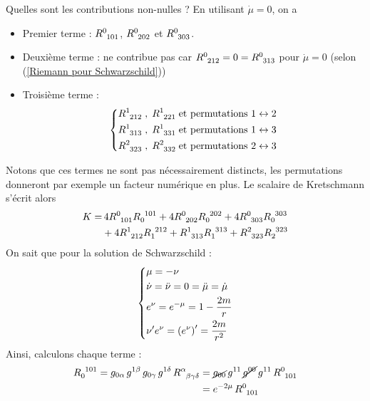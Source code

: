 Quelles sont les contributions non-nulles ? En utilisant $\dot{\mu} = 0$, on a
\begin{itemize}
    \item Premier terme : $R\indices{^0_{1 01}}$, $R\indices{^0_{2 02}}$ et $R\indices{^0_{3 03}}$.
    \item Deuxième terme : ne contribue pas car $R\indices{^0_{212}} =0 = R\indices{^0_{313}}$ pour $\dot{\mu} = 0$ (selon (\ref{Riemann pour Schwarzschild}))
    \item Troisième terme :
    \begin{align}
        \begin{dcases}
            R\indices{^1_{212}} \; , \; R\indices{^1_{221}} \; \text{et permutations $1 \leftrightarrow 2$} \\
            R\indices{^1_{313}} \; , \; R\indices{^1_{331}} \; \text{et permutations $1 \leftrightarrow 3$}\\
            R\indices{^2_{323}} \; , \; R\indices{^2_{332}} \; \text{et permutations $2 \leftrightarrow 3$}
        \end{dcases}
    \end{align}
\end{itemize}
Notons que ces termes ne sont pas nécessairement distincts, les permutations donneront par exemple un facteur numérique en plus. Le scalaire de Kretschmann s'écrit alors
\begin{align}
    \nonumber
    K=& \, 4 R\indices{^0_{101}} R\indices{_0^{101}} + 4 R\indices{^0_{202}} R\indices{_0^{202}} + 4 R\indices{^0_{303}} R\indices{_0^{303}}\\
    \label{eq: Kretschmann intermediaire}
    &+ 4 R\indices{^1_{212}} R\indices{_1^{212}} + R\indices{^1_{313}} R\indices{_1^{313}} + R\indices{^2_{323}} R\indices{_2^{323}}
\end{align}
On sait que pour la solution de Schwarzschild :
\begin{align}
    \label{propris schw pour kretschmann}
    \begin{dcases}
        \mu = -\nu \\
        \dot{\nu} = \ddot{\nu} = 0 = \ddot{\mu} = \dot{\mu}\\
        e^\nu = e^{-\mu} = 1 - \frac{2m}{r}\\
        \nu' e^\nu = \left( e^\nu \right)' = \frac{2m}{r^2}
    \end{dcases}
\end{align}
Ainsi, calculons chaque terme :
\begin{align}
    R\indices{_0^{101}} = g_{0\alpha}\, g^{1\beta}\, g_{0\gamma} \, g^{1 \delta} \, R\indices{^\alpha_{\beta \gamma \delta}} & = \cancel{g_{00}}\,  g^{11} \, \cancel{g^{00}}\,  g^{11}\,  R\indices{^0_{101}} \\
    &= e^{-2\mu} \,  R\indices{^0_{101}}
\end{align}
